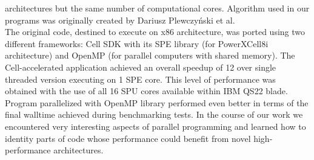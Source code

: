architectures but the same number of computational cores.
Algorithm used in our programs  was originally created by Dariusz Plewczy\'nski
et al. \cite{3dhit1,3dhit2}\\
The original code, destined to execute on x86 architecture, was ported using two
different frameworks: Cell SDK with its SPE library (for PowerXCell8i
architecture) and OpenMP (for parallel computers with shared memory).
The Cell-accelerated application achieved an overall speedup of 12 over
single threaded version executing on 1 SPE core.
This level of performance was obtained with the use of all 16 SPU cores
available within IBM QS22 blade.
Program parallelized with OpenMP library performed even better in terms of the
final walltime achieved during benchmarking tests.
In the course of our work we encountered very interesting aspects of parallel
programming and learned how to identity parts of code whose performance
could benefit from novel high-performance architectures.

